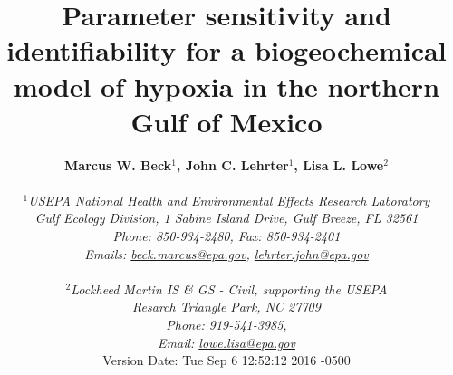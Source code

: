 \documentclass[letterpaper,12pt,oneside]{article}\usepackage[]{graphicx}\usepackage[]{color}
\begin{document}
\raggedbottom
\linenumbers
\raggedright
{}
\setlength{\parindent}{0.5in}
\renewcommand\refname{References \vspace{12pt}}

\begin{singlespace}
\title{{\bf {\Large Parameter sensitivity and identifiability for a biogeochemical model of hypoxia in the northern {G}ulf of {M}exico}}}
\author{
  {\bf {\normalsize Marcus W. Beck$^1$, John C. Lehrter$^1$, Lisa L. Lowe$^2$}}
  \\\\{\textit {\normalsize $^1$USEPA National Health and Environmental Effects Research Laboratory}}
  \\{\textit {\normalsize Gulf Ecology Division, 1 Sabine Island Drive, Gulf Breeze, FL 32561}}
	\\{\textit {\normalsize Phone: 850-934-2480, Fax: 850-934-2401}}
	\\{\textit {\normalsize Emails: \href{mailto:beck.marcus@epa.gov}{beck.marcus@epa.gov}, \href{mailto:lehrter.john@epa.gov}{lehrter.john@epa.gov}}}
	\\\\{\textit {\normalsize $^2$Lockheed Martin IS \& GS - Civil, supporting the USEPA}}
	\\{\textit {\normalsize Resarch Triangle Park, NC 27709}}
	\\{\textit {\normalsize Phone: 919-541-3985,}}
	\\{\textit {\normalsize Email: \href{mailto:lowe.lisa@epa.gov}{lowe.lisa@epa.gov}}}
  \vspace{1in} 
  \\ Version Date:   Tue Sep 6 12:52:12 2016 -0500
	}
\date{}
\maketitle
\end{singlespace}
\clearpage
\end{document}
